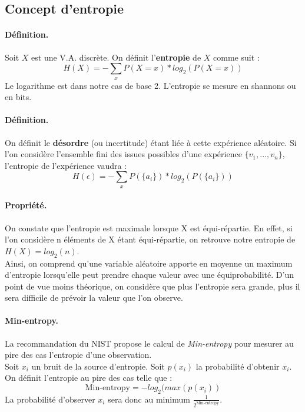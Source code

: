 \subsection{Concept d'entropie}
\paragraph{Définition.\\}
Soit $X$ est une V.A. discrète. On définit l'\textbf{entropie} de $X$ comme suit : 
$$H(X) = - \sum_x P(X=x)*log_2(P(X=x))	 $$ 
Le logarithme est dans notre cas de base 2. L'entropie se mesure en shannons ou en bits.\\

\paragraph{Définition.\\}
On définit le \textbf{désordre} (ou incertitude) étant liée à cette expérience aléatoire. Si l'on considère l'ensemble fini des issues possibles d'une expérience $\lbrace v_1,...,v_n \rbrace$, l'entropie de l'expérience vaudra :
$$H(\epsilon) = - \sum_x P(\lbrace a_i \rbrace)*log_2(P(\lbrace a_i \rbrace))	 $$ 

\paragraph{Propriété.\\} 
On constate que l'entropie est maximale lorsque X est équi-répartie. En effet, si l'on considère n éléments de X étant équi-répartie, on retrouve notre entropie de $H(X) = log_2(n)$. \\


Ainsi, on comprend qu'une variable aléatoire apporte en moyenne un maximum d'entropie lorsqu'elle peut prendre chaque valeur avec une équiprobabilité. D'un point de vue moins théorique, on considère que plus l'entropie sera grande, plus il sera difficile de prévoir la valeur que l'on observe.

\paragraph{Min-entropy.\\}
La recommandation du NIST propose le calcul de \textit{Min-entropy} pour mesurer au pire des cas l'entropie d'une observation. \\

Soit $x_i$ un bruit de la source d'entropie. Soit $p(x_i)$ la probabilité d'obtenir $x_i$. On définit l'entropie au pire des cas telle que : 
$$\text{Min-entropy}=-log_2(max(p(x_i))$$
La probabilité d'observer $x_i$ sera donc au minimum $\frac{1}{2^\text{Min-entropy}}$.

